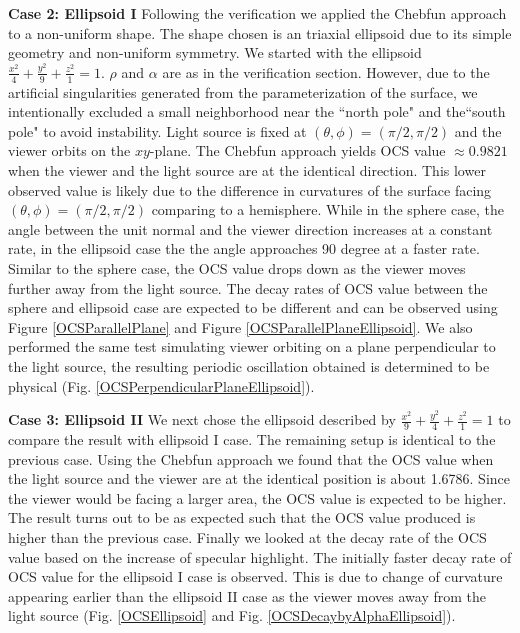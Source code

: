 \documentclass[11pt,reqno]{amsart}
\theoremstyle{definition}
\begin{document}
{\bf Case 2: Ellipsoid I} Following the verification we applied the Chebfun approach to a non-uniform shape. The shape chosen is an triaxial ellipsoid due to its simple geometry and non-uniform symmetry. We started with the ellipsoid $\frac{x^2}{4}+\frac{y^2}{9}+\frac{z^2}{1} = 1$. $\rho$ and $\alpha$ are as in the verification section. However, due to the artificial singularities generated from the parameterization of the surface, we intentionally excluded a small neighborhood near the ``north pole" and the``south pole" to avoid instability. Light source is fixed at $(\theta,\phi) = (\pi/2, \pi/2)$ and the viewer orbits on the $xy$-plane. The Chebfun approach yields OCS value $\approx 0.9821$ when the viewer and the light source are at the identical direction. This lower observed value is likely due to the difference in curvatures of the surface facing $(\theta, \phi)=(\pi/2, \pi/2)$ comparing to a hemisphere. While in the sphere case, the angle between the unit normal and the viewer direction increases at a constant rate, in the ellipsoid case the the angle approaches 90 degree at a faster rate. Similar to the sphere case, the OCS value drops down as the viewer moves further away from the light source. The decay rates of OCS value between the sphere and ellipsoid case are expected to be different and can be observed using Figure \ref{OCSParallelPlane} and Figure \ref{OCSParallelPlaneEllipsoid}. We also performed the same test simulating viewer orbiting on a plane perpendicular to the light source, the resulting periodic oscillation obtained is determined to be physical (Fig. \ref{OCSPerpendicularPlaneEllipsoid}).

{\bf Case 3: Ellipsoid II} We next chose the ellipsoid described by $\frac{x^2}{9}+\frac{y^2}{4}+\frac{z^2}{1} = 1$ to compare the result with ellipsoid I case. The remaining setup is identical to the previous case. Using the Chebfun approach we found that the OCS value when the light source and the viewer are at the identical position is about 1.6786. Since the viewer would be facing a larger area, the OCS value is expected to be higher. The result turns out to be as expected such that the OCS value produced is higher than the previous case. Finally we looked at the decay rate of the OCS value based on the increase of specular highlight. The initially faster decay rate of OCS value for the ellipsoid I case is observed. This is due to change of curvature appearing earlier than the ellipsoid II case as the viewer moves away from the light source (Fig. \ref{OCSEllipsoid} and Fig. \ref{OCSDecaybyAlphaEllipsoid}).
\end{document}
